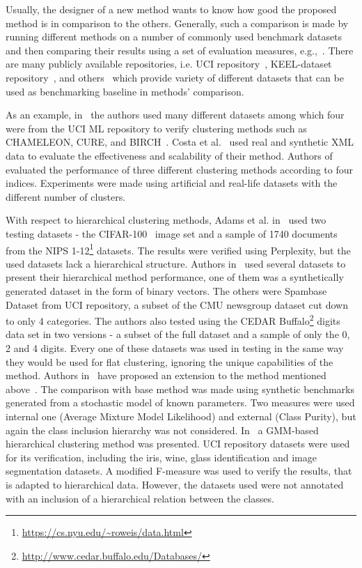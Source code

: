 \documentclass{article}
\begin{document}
Usually, the designer of a new method wants to know how good the proposed method is in comparison to the others. Generally, such a comparison is made by running different methods on a number of commonly used benchmark datasets and then comparing their results using a set of evaluation measures, e.g.,~\cite{Dreiseitl200128,Cooper1997107,Douglas2011544,Kampichler2010441,DBLP:journals/corr/abs-1301-7401,steinbach00comparison,Kakkar2014}. There are many publicly available repositories, i.e. UCI repository~\cite{Dua2017UCI}, KEEL-dataset repository~\cite{alcala2011keel}, and others~\cite{2015ClusteringDatasets, OpenML2013} which provide variety of different datasets that can be used as benchmarking baseline in methods' comparison. 

As an example, in~\cite{Dash2003109} the authors used many different datasets among which four were from the UCI ML repository to verify clustering methods such as CHAMELEON, CURE, and BIRCH~\cite{Karypis_chameleon:a,citeulike:1304883}. Costa et al.~\cite{Costa:2013} used real and synthetic XML data to evaluate the effectiveness and scalability of their method. Authors of~\cite{Maulik:2002:PEC:628333.628859} evaluated the performance of three different clustering methods according to four indices. Experiments were made using artificial and real-life datasets with the different number of clusters.

With respect to hierarchical clustering methods, Adams et al. in~\cite{ghahramani2010tree} used two testing datasets - the CIFAR-100~\cite{krizhevsky2009learning} image set and a sample of 1740 documents from the NIPS 1-12\footnote{\url{https://cs.nyu.edu/~roweis/data.html}} datasets. The results were verified using Perplexity, but the used datasets lack a hierarchical structure. Authors in~\cite{2010_bayesian_rose_trees} used several datasets to present their hierarchical method performance, one of them was a synthetically generated dataset in the form of binary vectors. The others were Spambase Dataset from UCI repository, a subset of the CMU newsgroup dataset cut down to only 4 categories. The authors also tested using the CEDAR Buffalo\footnote{\url{http://www.cedar.buffalo.edu/Databases/}} digits data set in two versions - a subset of the full dataset and a sample of only the 0, 2 and 4 digits. Every one of these datasets was used in testing in the same way they would be used for flat clustering, ignoring the unique capabilities of the method. Authors in~\cite{Spytkowski2012} have proposed an extension to the method mentioned above~\cite{ghahramani2010tree}. The comparison with base method was made using synthetic benchmarks generated from a stochastic model of known parameters. Two measures were used internal one (Average Mixture Model Likelihood) and external (Class Purity), but again the class inclusion hierarchy was not considered. In~\cite{Olech2016} a GMM-based hierarchical clustering method was presented. UCI repository datasets were used for its verification, including the iris, wine, glass identification and image segmentation datasets. A modified F-measure was used to verify the results, that is adapted to hierarchical data. However, the datasets used were not annotated with an inclusion of a hierarchical relation between the classes.
\end{document}
